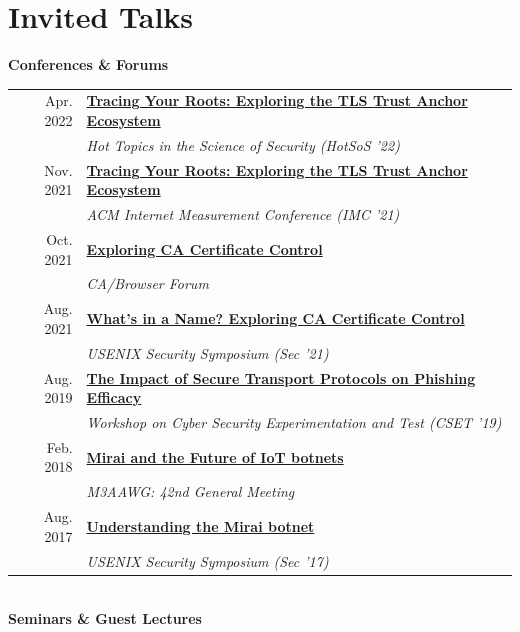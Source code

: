 \documentclass[10pt,singlecolumn]{article} %
\begin{document}
\section{Invited Talks} 

\textbf{Conferences \& Forums}\\

\begin{tabular}{rl}
Apr. 2022 & \textbf{\href{https://cps-vo.org/node/82522}{Tracing Your Roots: Exploring the TLS Trust Anchor Ecosystem}}\\
& \emph{Hot Topics in the Science of Security (HotSoS '22)}\\
Nov. 2021 & \textbf{\href{https://zanema.com/videos/imc21-roots.mp4}{Tracing Your Roots: Exploring the TLS Trust Anchor Ecosystem}}\\
& \emph{ACM Internet Measurement Conference (IMC '21)} \\
Oct. 2021 & \textbf{\href{https://zanema.com/slides/cab_forum_ca_transparency.pdf}{Exploring CA Certificate Control}}\\
& \emph{CA/Browser Forum} \\
Aug. 2021 & \textbf{\href{https://www.youtube.com/watch?v=Aq1o8prmoyE}{What's in a Name? Exploring CA Certificate Control}} \\
& \emph{USENIX Security Symposium (Sec '21)} \\
Aug. 2019 & \textbf{\href{https://zanema.com/slides/cset-https-phishing-2019.pdf}{The Impact of Secure Transport Protocols on Phishing Efficacy}} \\
& \emph{Workshop on Cyber Security Experimentation and Test (CSET '19)} \\
Feb. 2018 & \textbf{\href{https://zanema.com/slides/m3aawg_mirai.pdf}{Mirai and the Future of IoT botnets}}\\
& \emph{M3AAWG: 42nd General Meeting} \\ 
Aug. 2017 & \textbf{\href{https://www.youtube.com/watch?v=1pywzRTJDaY}{Understanding the Mirai botnet}} \\
& \emph{USENIX Security Symposium (Sec '17)} \\ 
\end{tabular} \\

\vspace{0.3cm}
\textbf{Seminars \& Guest Lectures}\\
\end{document}
